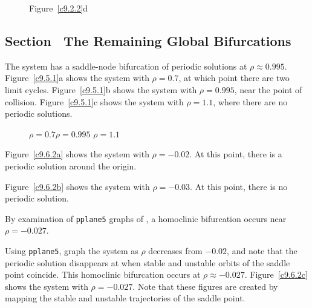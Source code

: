 \documentclass{ximera}
\begin{document}
\begin{figure}[htb]
			\centerline{%
			}
		\centerline{Figure~\ref{c9.2.2}d}
\end{figure}



\subsection*{Section~\protect{\ref{S:GlobalBif}} The Remaining Global Bifurcations}

The system has a saddle-node bifurcation of periodic solutions
at $\rho \approx 0.995$.  Figure~\ref{c9.5.1}a shows the system
with $\rho = 0.7$, at which point there are two limit cycles. 
Figure~\ref{c9.5.1}b shows the system with $\rho = 0.995$, near the point
of collision.  Figure~\ref{c9.5.1}c shows the system with $\rho = 1.1$, where
there are no periodic solutions.

\begin{figure}[htb]
                       \centerline{%
                       }
		\centerline{$\rho = 0.7$\hspace{1.3in}$\rho = 0.995$
\hspace{1.3in}$\rho = 1.1$}
\end{figure}

 Figure~\ref{c9.6.2a} shows the system with $\rho = -0.02$. 
At this point, there is a periodic solution around the origin.

 Figure~\ref{c9.6.2b} shows the system with $\rho = -0.03$. 
At this point, there is no periodic solution.

\ans By examination of {\tt pplane5} graphs of , a homoclinic
bifurcation occurs near $\rho = -0.027$.

\soln 
Using {\tt pplane5}, graph the system as $\rho$ decreases from $-0.02$, and
note that the periodic solution disappears at when stable and unstable
orbits of the saddle point coincide.  This homoclinic bifurcation occurs
at $\rho \approx -0.027$.  Figure~\ref{c9.6.2c} shows the system with
$\rho = -0.027$.  Note that these figures are created by mapping the stable
and unstable trajectories of the saddle point.
\end{document}
